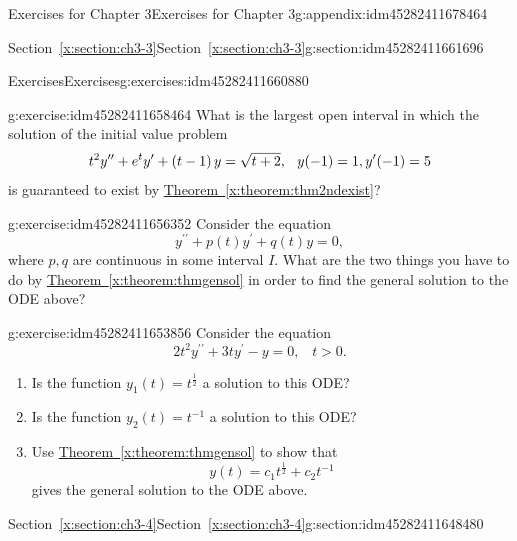 \documentclass[oneside,10pt,]{book}
\numberwithin{equation}{section}
\numberwithin{equation}{section}
\begin{document}
\begin{appendixptx}{Exercises for Chapter 3}{}{Exercises for Chapter 3}{}{}{g:appendix:idm45282411678464}
\begin{sectionptx}{Section~\ref*{x:section:ch3-3}}{}{Section~\ref*{x:section:ch3-3}}{}{}{g:section:idm45282411661696}
\begin{exercises-subsection-numberless}{Exercises}{}{Exercises}{}{}{g:exercises:idm45282411660880}
\begin{divisionexercise}{2}{}{}{g:exercise:idm45282411658464}%
What is the largest open interval in which the solution of the initial value problem%
\begin{equation*}
t^{2}y^{\prime\prime}+e^{t}y^{\prime}+\left(t-1\right)y=\sqrt{t+2}, \hspace{.1in}
y(-1)=1,y^{\prime}(-1)=5
\end{equation*}
is guaranteed to exist by \hyperref[x:theorem:thm2ndexist]{Theorem~\ref{x:theorem:thm2ndexist}}?%
\end{divisionexercise}%
\begin{divisionexercise}{3}{}{}{g:exercise:idm45282411656352}%
Consider the equation%
\begin{equation*}
y^{\prime\prime}+p(t)y^{\prime}+q(t)y=0,
\end{equation*}
where \(p,q\) are continuous in some interval \(I\). What are the two things you have to do by \hyperref[x:theorem:thmgensol]{Theorem~\ref{x:theorem:thmgensol}} in order to find the general solution to the ODE above?\end{divisionexercise}%
\begin{divisionexercise}{4}{}{}{g:exercise:idm45282411653856}%
Consider the equation%
\begin{equation*}
2t^{2}y^{\prime\prime}+3ty^{\prime}-y=0,\,\,\,\,\,t>0.
\end{equation*}
%
%
\begin{enumerate}[label=(\alph*)]
\item{}Is the function \(y_{1}(t)=t^{\frac{1}{2}}\) a solution to this ODE?%
\item{}Is the function \(y_{2}(t)=t^{-1}\) a solution to this ODE?%
\item{}Use \hyperref[x:theorem:thmgensol]{Theorem~\ref{x:theorem:thmgensol}} to show that%
\begin{equation*}
y(t)=c_{1}t^{\frac{1}{2}}+c_{2}t^{-1}
\end{equation*}
gives the general solution to the ODE above.%
\end{enumerate}
\end{divisionexercise}%
\end{exercises-subsection-numberless}
\end{sectionptx}
%
%
\typeout{************************************************}
\typeout{************************************************}
%
\begin{sectionptx}{Section~\ref*{x:section:ch3-4}}{}{Section~\ref*{x:section:ch3-4}}{}{}{g:section:idm45282411648480}

\end{sectionptx}
\end{appendixptx}
\end{document}
